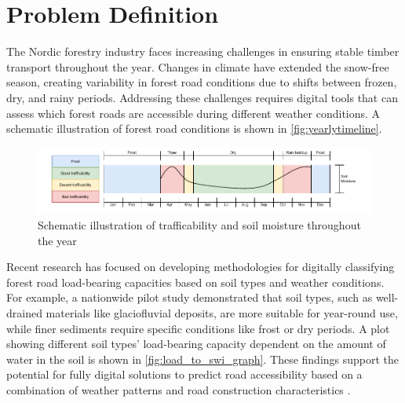 \section{Problem Definition}
The Nordic forestry industry faces increasing challenges in ensuring stable timber transport throughout the year. Changes in climate have extended the snow-free season, creating variability in forest road conditions due to shifts between frozen, dry, and rainy periods. Addressing these challenges requires digital tools that can assess which forest roads are accessible during different weather conditions. A schematic illustration of forest road conditions is shown in \autoref{fig:yearlytimeline}.

\begin{figure}[h]
    \centering
    \centerline{\includegraphics[width=1.3\linewidth]{figures/yearlytimeline.pdf}}
    \caption{Schematic illustration of trafficability and soil moisture throughout the year}
    \label{fig:yearlytimeline}
\end{figure}

Recent research has focused on developing methodologies for digitally classifying forest road load-bearing capacities based on soil types and weather conditions. For example, a nationwide pilot study demonstrated that soil types, such as well-drained materials like \gls{glaciofluvial deposit}s, are more suitable for year-round use, while finer sediments require specific conditions like frost or dry periods. A plot showing different soil types' load-bearing capacity dependent on the amount of water in the soil is shown in \autoref{fig:load_to_swi_graph}. These findings support the potential for fully digital solutions to predict road accessibility based on a combination of weather patterns and road construction characteristics \cite{fjeld2023trafficability}.

